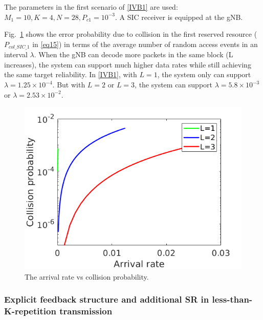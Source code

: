 \documentclass{ieeeaccess}
\begin{document}
The parameters in the first scenario of \ref{IVB1} are used:  $M_1=10, K=4, N=28, P_{c1}=10^{-3}$. A SIC receiver is equipped at the gNB. 

Fig.~\ref{fig18} shows the error probability due to collision in the first reserved resource ($P_{col\_SIC\_1}$ in \eqref{eq15}) in terms of  the average number of random access events in an interval $\lambda$. When the gNB can decode more packets in the same block (L increases), the system can support much higher data rates while still achieving the same target reliability. In \ref{IVB1}, with $L=1$, the system only can support $\lambda=1.25\times10^{-4}$. But with $L=2$ or $L=3$, the system can support $\lambda=5.8\times10^{-3}$ or $\lambda=2.53\times10^{-2}$.

\begin{figure}[htbp]
\centerline{\includegraphics[scale=0.32]{fig18.png}}
\caption{The arrival rate vs collision probability.}
\vspace{-2mm}
\label{fig18}

\end{figure}

\subsubsection{Explicit feedback structure and additional SR in less-than-K-repetition transmission}
\end{document}
